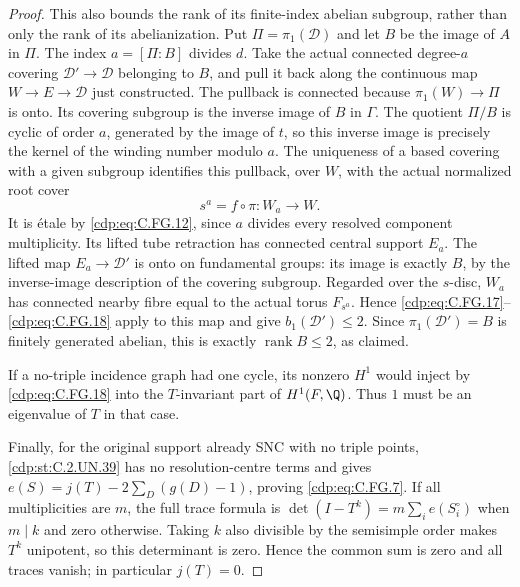 \begin{proof}
This also bounds the rank of its finite-index abelian subgroup,
rather than only the rank of its abelianization. Put
$\Pi=\pi_1(\mathcal D)$ and let $B$ be the image of $A$ in $\Pi$.
The index $a=[\Pi:B]$ divides $d$. Take the actual connected
degree-$a$ covering $\mathcal D'\to\mathcal D$ belonging to $B$,
and pull it back along the continuous map
$W\to E\to\mathcal D$ just constructed. The pullback is connected
because $\pi_1(W)\to\Pi$ is onto. Its covering subgroup is the
inverse image of $B$ in $\Gamma$. The quotient $\Pi/B$ is cyclic
of order $a$, generated by the image of $t$, so this inverse
image is precisely the kernel of the winding number modulo $a$.
The uniqueness of a based covering with a given subgroup
identifies this pullback, over $W$, with the actual normalized
root cover
\[
                  s^a=f\circ\pi:W_a\longrightarrow W. \tag{C.FG.19}\label{cdp:eq:C.FG.19}
\]
It is \'{e}tale by \eqref{cdp:eq:C.FG.12}, since $a$ divides every resolved
component multiplicity. Its lifted tube retraction has connected
central support $E_a$. The lifted map
$E_a\to\mathcal D'$ is onto on fundamental groups: its image is
exactly $B$, by the inverse-image description of the covering
subgroup. Regarded over the $s$-disc, $W_a$ has connected nearby
fibre equal to the actual torus $F_{s^a}$. Hence \eqref{cdp:eq:C.FG.17}--\eqref{cdp:eq:C.FG.18}
apply to this map and give $b_1(\mathcal D')\le2$. Since
$\pi_1(\mathcal D')=B$ is finitely generated abelian, this is
exactly $\operatorname{rank}B\le2$, as claimed.

If a no-triple incidence graph had one cycle, its nonzero
$H^1$ would inject by \eqref{cdp:eq:C.FG.18} into the $T$-invariant part of
$H^1(F,\Q)$. Thus $1$ must be an eigenvalue of $T$ in that case.

Finally, for the original support already SNC with no triple
points, \ref{cdp:st:C.2.UN.39} has no resolution-centre terms and gives
$e(S)=j(T)-2\sum_D(g(D)-1)$, proving \eqref{cdp:eq:C.FG.7}.
If all multiplicities are $m$, the full trace formula is
$\det(I-T^k)=m\sum_i e(S_i^\circ)$ when $m\mid k$ and zero
otherwise. Taking $k$ also divisible by the semisimple order makes
$T^k$ unipotent, so this determinant is zero. Hence the common
sum is zero and all traces vanish; in particular $j(T)=0$.
\end{proof}



